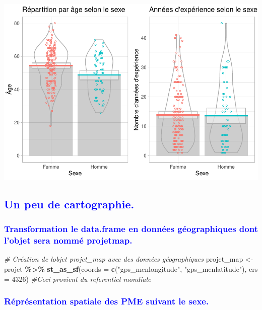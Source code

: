 \documentclass[
]{article}
\newenvironment{Shaded}{\begin{snugshade}}{\end{snugshade}}
\newcommand{\AttributeTok}[1]{\textcolor[rgb]{0.13,0.29,0.53}{#1}}
\newcommand{\CommentTok}[1]{\textcolor[rgb]{0.56,0.35,0.01}{\textit{#1}}}
\newcommand{\DecValTok}[1]{\textcolor[rgb]{0.00,0.00,0.81}{#1}}
\newcommand{\FunctionTok}[1]{\textcolor[rgb]{0.13,0.29,0.53}{\textbf{#1}}}
\newcommand{\NormalTok}[1]{#1}
\newcommand{\OtherTok}[1]{\textcolor[rgb]{0.56,0.35,0.01}{#1}}
\newcommand{\SpecialCharTok}[1]{\textcolor[rgb]{0.81,0.36,0.00}{\textbf{#1}}}
\newcommand{\StringTok}[1]{\textcolor[rgb]{0.31,0.60,0.02}{#1}}
\begin{document}
\includegraphics{Projet_R_ISE_1_files/figure-latex/unnamed-chunk-31-1.pdf}\\

\textcolor{blue}{\subsection{ Un peu de cartographie.}}

\textcolor{blue}{\subsubsection{Transformation le data.frame en données géographiques dont l'objet sera nommé projetmap.}}

\hfill\break

\begin{Shaded}
\begin{Highlighting}[]
\CommentTok{\# Création de l\textquotesingle{}objet projet\_map avec des données géographiques}
\NormalTok{projet\_map }\OtherTok{\textless{}{-}}\NormalTok{ projet }\SpecialCharTok{\%\textgreater{}\%}
  \FunctionTok{st\_as\_sf}\NormalTok{(}\AttributeTok{coords =} \FunctionTok{c}\NormalTok{(}\StringTok{"gps\_menlongitude"}\NormalTok{, }\StringTok{"gps\_menlatitude"}\NormalTok{), }\AttributeTok{crs =} \DecValTok{4326}\NormalTok{)}
\CommentTok{\#Ceci provient du referentiel mondiale}
\end{Highlighting}
\end{Shaded}

\hfill\break

\textcolor{blue}{\subsubsection{Réprésentation spatiale des PME suivant le sexe.}}
\end{document}
